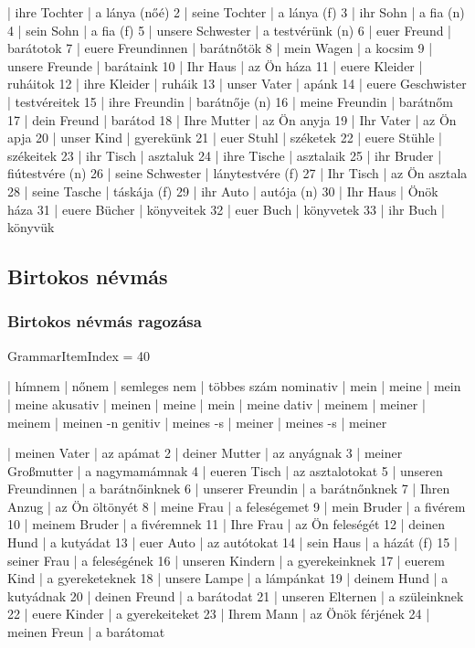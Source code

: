 \documentclass{article}
\newenvironment{desc}{\verbatim}{\endverbatim}
\newenvironment{exmp}{\verbatim}{\endverbatim}
\begin{document}
\begin{exmp}
1 | ihre Tochter | a lánya (nőé)
2 | seine Tochter | a lánya (f)
3 | ihr Sohn | a fia (n)
4 | sein Sohn | a fia (f)
5 | unsere Schwester | a testvérünk (n)
6 | euer Freund | barátotok
7 | euere Freundinnen | barátnőtök
8 | mein Wagen | a kocsim
9 | unsere Freunde | barátaink
10 | Ihr Haus | az Ön háza
11 | euere Kleider | ruháitok
12 | ihre Kleider | ruháik
13 | unser Vater | apánk
14 | euere Geschwister | testvéreitek
15 | ihre Freundin | barátnője (n)
16 | meine Freundin | barátnőm
17 | dein Freund | barátod
18 | Ihre Mutter | az Ön anyja
19 | Ihr Vater | az Ön apja
20 | unser Kind | gyerekünk
21 | euer Stuhl | széketek
22 | euere Stühle | székeitek
23 | ihr Tisch | asztaluk
24 | ihre Tische | asztalaik
25 | ihr Bruder | fiútestvére (n)
26 | seine Schwester | lánytestvére (f)
27 | Ihr Tisch | az Ön asztala
28 | seine Tasche | táskája (f)
29 | ihr Auto | autója (n)
30 | Ihr Haus | Önök háza
31 | euere Bücher | könyveitek
32 | euer Buch | könyvetek
33 | ihr Buch | könyvük
\end{exmp}

\subsection{Birtokos névmás}

\subsubsection{Birtokos névmás ragozása}

GrammarItemIndex = 40

\begin{desc}
          | hímnem    | nőnem  | semleges nem | többes szám 
nominativ | mein      | meine  | mein         | meine 
akusativ  | meinen    | meine  | mein         | meine 
dativ     | meinem    | meiner | meinem       | meinen -n 
genitiv   | meines -s | meiner | meines -s    | meiner 
\end{desc}

\begin{exmp}
1 | meinen Vater | az apámat
2 | deiner Mutter | az anyágnak
3 | meiner Großmutter | a nagymamámnak
4 | eueren Tisch | az asztalotokat
5 | unseren Freundinnen | a barátnőinknek
6 | unserer Freundin | a barátnőnknek
7 | Ihren Anzug | az Ön öltönyét
8 | meine Frau | a feleségemet
9 | mein Bruder | a fivérem
10 | meinem Bruder | a fivéremnek
11 | Ihre Frau | az Ön feleségét
12 | deinen Hund | a kutyádat
13 | euer Auto | az autótokat
14 | sein Haus | a házát (f)
15 | seiner Frau | a feleségének
16 | unseren Kindern | a gyerekeinknek
17 | euerem Kind | a gyereketeknek
18 | unsere Lampe | a lámpánkat
19 | deinem Hund | a kutyádnak
20 | deinen Freund | a barátodat
21 | unseren Elternen | a szüleinknek
22 | euere Kinder | a gyerekeiteket
23 | Ihrem Mann | az Önök férjének
24 | meinen Freun | a barátomat
\end{exmp}
\end{document}
